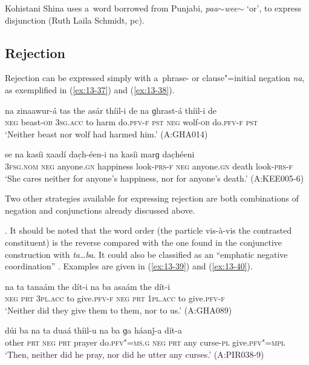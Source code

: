 Kohistani Shina uses a~word borrowed from Punjabi, \textit{paa$\sim$wee$\sim$} `or', to express disjunction (Ruth Laila Schmidt, pc).


\subsection{Rejection}
\label{subsec:13-2-4}

 Rejection can be expressed simply with a~phrase- or clause"=initial negation \textit{na}, as exemplified in (\ref{ex:13-37}) and (\ref{ex:13-38}).

\begin{exe}
\ex
\label{ex:13-37}
\gll na zinaawur-á tas the asár thíil-i de na ɡhrast-á thíil-i de \\
\textsc{neg} beast-\textsc{ob} \textsc{3sg.acc} to harm do.\textsc{pfv-f} \textsc{pst}  \textsc{neg} wolf-\textsc{ob} do.\textsc{pfv-f} \textsc{pst} \\
\glt `Neither beast nor wolf had harmed him.' (A:GHA014)

\ex
\label{ex:13-38}
\gll se na kasíi xaadí dac̣h-éen-i na kasíi marɡ dac̣héeni \\
\textsc{3fsg.nom} \textsc{neg} anyone.\textsc{gn} happiness look-\textsc{prs-f}  \textsc{neg} anyone.\textsc{gn} death look-\textsc{prs-f}  \\
\glt `She cares neither for anyone's happiness, nor for anyone's death.' (A:KEE005-6) 
\end{exe}

Two other strategies available for expressing rejection are both combinations of negation and conjunctions already discussed above.


. It should be noted that the word order (the particle vis-à-vis the contrasted constituent) is the reverse compared with the one found in the conjunctive construction with \textit{ta{\ldots}ba}. It could also be classified as an ``emphatic negative coordination'' \citep[17--19]{haspelmath2007}. Examples are given in (\ref{ex:13-39}) and (\ref{ex:13-40}).

\begin{exe}
\ex
\label{ex:13-39}
\gll na ta tanaám the dít-i na ba asaám the dít-i \\
\textsc{neg} \textsc{prt} \textsc{3pl.acc} to give.\textsc{pfv-f} \textsc{neg} \textsc{prt} \textsc{1pl.acc} to give.\textsc{pfv-f}  \\
\glt `Neither did they give them to them, nor to us.' (A:GHA089)

\ex
\label{ex:13-40}
\gll dúi ba na ta duaá thíil-u na ba ɡa háanǰ-a dít-a \\
other \textsc{prt} \textsc{neg} \textsc{prt} prayer do.\textsc{pfv"=ms.g} \textsc{neg} \textsc{prt} any curse-\textsc{pl} give.\textsc{pfv"=mpl}\\
\glt `Then, neither did he pray, nor did he utter any curses.' (A:PIR038-9) 
\end{exe}

